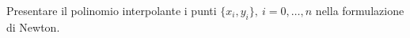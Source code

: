 Presentare il polinomio interpolante i punti $\{ x_i, y_i\},\
i=0, \ldots, n$ nella formulazione di Newton.
